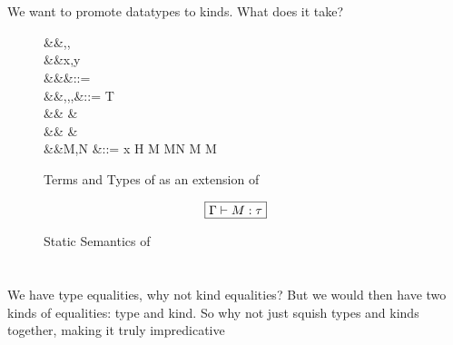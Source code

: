 \documentclass[manuscript,screen,nonacm]{acmart}
\begin{document}
\section{\SFP}\label{sec:sfp} %
We want to promote datatypes to kinds. What does it take?
\begin{figure}[ht]
  \centering
  \begin{syntax}
     &&\alpha,\beta,\gamma \\
     &&x,y          \\
         &&\kappa                  &::= \star \mid \kappa \to \kappa \mid \syntaxhl{\tau \sim \sigma}\\
         &&\tau,\sigma,\gamma,\nu  &::= \alpha \mid T \mid {} \mid \tau \to \tau \mid \Forall {\alpha\co\kappa} \tau\\
    &&                        &\syntaxhl{\mid \sym \Co \mid \trans \nu \Co \mid \Co\At\tau \mid \left \Co \mid \right \Co} \\
    &&                        &\syntaxhl{\mid \leftc \Co \mid \rightc \Co \mid \Cast \Co \Co}\\
         &&M,N                     &::= x \mid H \mid {} M \mid M\App N \mid \TLam{\tau\co\kappa} M \mid M\App \tau
  \end{syntax}
  \caption{Terms and Types of \SFP as an extension of \SFC}
  \label{fig:system-fcp-syntax}
\end{figure}


\begin{figure}[ht]
  \centering
  \begin{gather*}
    \fbox{$\Gamma \vdash M : \tau$}
  \end{gather*}
  \caption{Static Semantics of \SFP}
  \label{fig:sfp-typing}
\end{figure}





\section{\SFK}\label{sec:sfk} %
We have type equalities, why not kind equalities?
But we would then have two kinds of equalities: type and kind.
So why not just squish types and kinds together, making it truly impredicative
\end{document}
